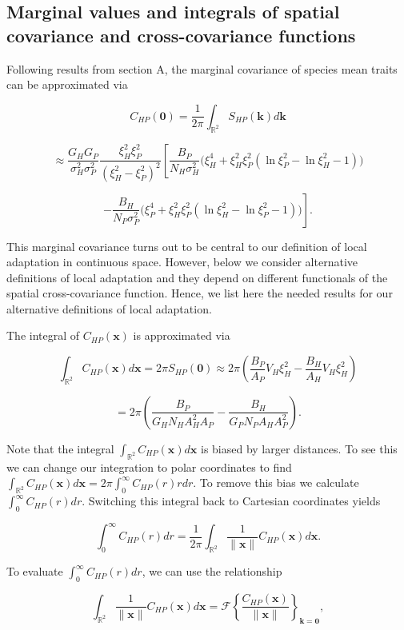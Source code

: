 \documentclass{article}
\begin{document}
\hypertarget{marginal-values-and-integrals-of-spatial-covariance-and-cross-covariance-functions}{%
\subsection{Marginal values and integrals of spatial covariance and
cross-covariance
functions}\label{marginal-values-and-integrals-of-spatial-covariance-and-cross-covariance-functions}}

Following results from section A, the marginal covariance of species
mean traits can be approximated via

\[C_{HP}(\pmb 0)=\frac{1}{2\pi}\int_{\mathbb R^2}S_{HP}(\pmb k)d\pmb k\]

\[\approx \frac{G_HG_P}{\sigma_H^2\sigma_P^2}\frac{\xi_H^2\xi_P^2}{(\xi_H^2-\xi_P^2)^2}\left[\frac{B_P}{N_H\sigma_H^2}\Big(\xi_H^4+\xi_H^2\xi_P^2(\ln\xi_P^2-\ln\xi_H^2-1)\Big)\right.\]

\[\left.-\frac{B_H}{N_P\sigma_P^2}\Big(\xi_P^4+\xi_H^2\xi_P^2(\ln\xi_H^2-\ln\xi_P^2-1)\Big)\right].\]

This marginal covariance turns out to be central to our definition of
local adaptation in continuous space. However, below we consider
alternative definitions of local adaptation and they depend on different
functionals of the spatial cross-covariance function. Hence, we list
here the needed results for our alternative definitions of local
adaptation.

The integral of \(C_{HP}(\pmb x)\) is approximated via

\[\int_{\mathbb R^2}C_{HP}(\pmb x)d\pmb x=2\pi S_{HP}(\pmb 0)\approx2\pi\left(\frac{B_P}{A_P}V_H\xi_H^2-\frac{B_H}{A_H}V_H\xi_H^2\right)\]

\[=2\pi \left(\frac{B_P}{G_HN_HA_H^2A_P}-\frac{B_H}{G_PN_PA_HA_P^2}\right).\]

Note that the integral \(\int_{\mathbb R^2}C_{HP}(\pmb x)d\pmb x\) is
biased by larger distances. To see this we can change our integration to
polar coordinates to find
\(\int_{\mathbb R^2}C_{HP}(\pmb x)d\pmb x=2\pi\int_0^\infty C_{HP}(r)rdr\).
To remove this bias we calculate \(\int_0^\infty C_{HP}(r)dr\).
Switching this integral back to Cartesian coordinates yields

\[\int_0^\infty C_{HP}(r)dr=\frac{1}{2\pi}\int_{\mathbb R^2}\frac{1}{\|\pmb x\|}C_{HP}(\pmb x)d\pmb x.\]

To evaluate \(\int_0^\infty C_{HP}(r)dr\), we can use the relationship

\[\int_{\mathbb R^2}\frac{1}{\|\pmb x\|}C_{HP}(\pmb x)d\pmb x=\mathcal F\left\{\frac{C_{HP}(\pmb x)}{\|\pmb x\|}\right\}_{\pmb k=\pmb 0},\]
\end{document}
